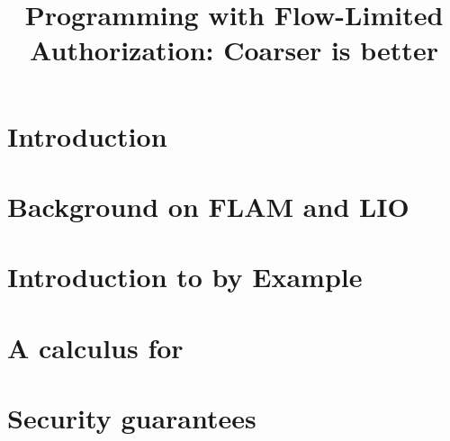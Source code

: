 \documentclass[conference]{IEEEtran}
\def\review{1}
\begin{document}
\title{Programming with Flow-Limited Authorization: Coarser is better}

\ifx\review\undefined
\author{
\and
{}
}
\else
\fi

\maketitle




\section{Introduction}\label{sec:introduction}


\section{Background on FLAM and LIO}\label{sec:background}



\section{Introduction to \lang{} by Example}\label{sec:programming}



\section{A calculus for \lang}\label{sec:calculus}



\section{Security guarantees}\label{sec:guarantees}
\end{document}
